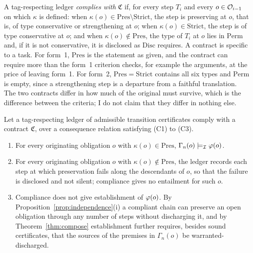 A tag-respecting ledger \emph{complies with} $\mathfrak{C}$ if, for every step $T_i$ and every $o\in\mathcal{O}_{i-1}$ on which $\kappa$ is defined: when $\kappa(o)\in\mathrm{Pres}\setminus\mathrm{Strict}$, the step is preserving at $o$, that is, of type conservative or strengthening at $o$; when $\kappa(o)\in\mathrm{Strict}$, the step is of type conservative at $o$; and when $\kappa(o)\notin\mathrm{Pres}$, the type of $T_i$ at $o$ lies in $\mathrm{Perm}$ and, if it is not conservative, it is disclosed as $\mathrm{Disc}$ requires. A contract is specific to a task. For form~1, $\mathrm{Pres}$ is the statement as given, and the contract can require more than the form~1 criterion checks, for example the arguments, at the price of leaving form~1. For form~2, $\mathrm{Pres}=\mathrm{Strict}$ contains all six types and $\mathrm{Perm}$ is empty, since a strengthening step is a departure from a faithful translation. The two contracts differ in how much of the original must survive, which is the difference between the criteria; I do not claim that they differ in nothing else.

\begin{proposition}
\label{prop:compliance}
Let a tag-respecting ledger of admissible transition certificates comply with a contract $\mathfrak{C}$, over a consequence relation satisfying (C1) to (C3).
\begin{enumerate}[label=(\roman*)]
\item For every originating obligation $o$ with $\kappa(o)\in\mathrm{Pres}$, $\Gamma_n(o)\models_{\mathcal{I}}\varphi(o)$.
\item For every originating obligation $o$ with $\kappa(o)\notin\mathrm{Pres}$, the ledger records each step at which preservation fails along the descendants of $o$, so that the failure is disclosed and not silent; compliance gives no entailment for such $o$.
\item Compliance does not give establishment of $\varphi(o)$. By Proposition~\ref{prop:independence}(i) a compliant chain can preserve an open obligation through any number of steps without discharging it, and by Theorem~\ref{thm:compose} establishment further requires, besides sound certificates, that the sources of the premises in $\Gamma_n(o)$ be warranted-discharged.
\end{enumerate}
\end{proposition}

